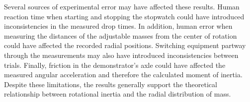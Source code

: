 \documentclass[11pt]{article}
\begin{document}
Several sources of experimental error may have affected these results. Human reaction time when starting and stopping the stopwatch could have introduced inconsistencies in the measured drop times. In addition, human error when measuring the distances of the adjustable masses from the center of rotation could have affected the recorded radial positions. Switching equipment partway through the measurements may also have introduced inconsistencies between trials. Finally, friction in the demonstrator's axle could have affected the measured angular acceleration and therefore the calculated moment of inertia. Despite these limitations, the results generally support the theoretical relationship between rotational inertia and the radial distribution of mass.
\end{document}
